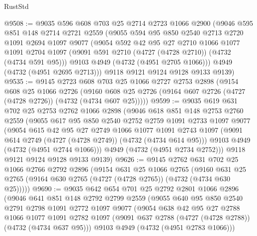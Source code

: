 \begin{lexlean}{RustStd}
\begin{coremodule}
{\begin{coremodule}
{{{{{{{{{{{{{{@9508 := @9035
    @596
    @608
    @703
    @25
    @2714
    @2723
    @1066
    @2900
    (@9046
      @595
      @851
      @148
      @2714
      @2721
      @2559
      (@9055
        @594
        @95
        @850
        @2540
        @2713
        @2720
        @1091
        @2694
        @1097
        @9077
        (@9054
          @592
          @42
          @95
          @27
          @2710
          @1066
          @1077
          @1091
          @2704
          @1097
          (@9091 @591 @2710 (@4727 (@4728 @2710)) (@4732 (@4734 @591 @95)))
          @9103
          @4949
          (@4732 (@4951 @2705 @1066)))
        @4949
        (@4732 (@4951 @2695 @2713)))
      @9118
      @9121
      @9124
      @9128
      @9133
      @9139)
@9535 := @9145
    @2723
    @608
    @703
    @25
    @1066
    @2727
    @2753
    @2898
    (@9154
      @608
      @25
      @1066
      @2726
      (@9160 @608 @25 @2726 (@9164 @607 @2726 (@4727 (@4728 @2726)) (@4732 (@4734 @607 @25)))))
@9599 := @9035
    @619
    @631
    @702
    @25
    @2753
    @2762
    @1066
    @2898
    (@9046
      @618
      @851
      @148
      @2753
      @2760
      @2559
      (@9055
        @617
        @95
        @850
        @2540
        @2752
        @2759
        @1091
        @2733
        @1097
        @9077
        (@9054
          @615
          @42
          @95
          @27
          @2749
          @1066
          @1077
          @1091
          @2743
          @1097
          (@9091 @614 @2749 (@4727 (@4728 @2749)) (@4732 (@4734 @614 @95)))
          @9103
          @4949
          (@4732 (@4951 @2744 @1066)))
        @4949
        (@4732 (@4951 @2734 @2752)))
      @9118
      @9121
      @9124
      @9128
      @9133
      @9139)
@9626 := @9145
    @2762
    @631
    @702
    @25
    @1066
    @2766
    @2792
    @2896
    (@9154
      @631
      @25
      @1066
      @2765
      (@9160 @631 @25 @2765 (@9164 @630 @2765 (@4727 (@4728 @2765)) (@4732 (@4734 @630 @25)))))
@9690 := @9035
    @642
    @654
    @701
    @25
    @2792
    @2801
    @1066
    @2896
    (@9046
      @641
      @851
      @148
      @2792
      @2799
      @2559
      (@9055
        @640
        @95
        @850
        @2540
        @2791
        @2798
        @1091
        @2772
        @1097
        @9077
        (@9054
          @638
          @42
          @95
          @27
          @2788
          @1066
          @1077
          @1091
          @2782
          @1097
          (@9091 @637 @2788 (@4727 (@4728 @2788)) (@4732 (@4734 @637 @95)))
          @9103
          @4949
          (@4732 (@4951 @2783 @1066)))
}}}}}}}}}}}}}}
\end{coremodule}}
\end{coremodule}
\end{lexlean}

